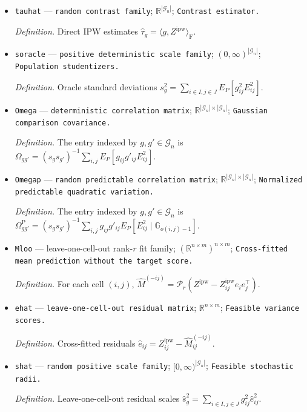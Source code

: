 \documentclass{article}
\begin{document}
\begin{itemize}
  \item \texttt{tauhat} --- \texttt{random contrast family}; \(\mathbb R^{|\mathcal G_n|}\); \texttt{Contrast estimator.}
  \par\smallskip\noindent\emph{Definition.} Direct IPW estimates \(\widehat\tau_g=\langle g,Z^{\mathrm{ipw}}\rangle_{\mathrm F}\).
  \item \texttt{soracle} --- \texttt{positive deterministic scale family}; \((0,\infty)^{|\mathcal G_n|}\); \texttt{Population studentizers.}
  \par\smallskip\noindent\emph{Definition.} Oracle standard deviations \(s_g^2=\sum_{i\in I,j\in J}E_P[g_{ij}^2E_{ij}^2]\).
  \item \texttt{Omega} --- \texttt{deterministic correlation matrix}; \(\mathbb R^{|\mathcal G_n|\times|\mathcal G_n|}\); \texttt{Gaussian comparison covariance.}
  \par\smallskip\noindent\emph{Definition.} The entry indexed by \(g,g'\in\mathcal G_n\) is \(\Omega_{gg'}=(s_gs_{g'})^{-1}\sum_{i,j}E_P[g_{ij}g'_{ij}E_{ij}^2]\).
  \item \texttt{Omegap} --- \texttt{random predictable correlation matrix}; \(\mathbb R^{|\mathcal G_n|\times|\mathcal G_n|}\); \texttt{Normalized predictable quadratic variation.}
  \par\smallskip\noindent\emph{Definition.} The entry indexed by \(g,g'\in\mathcal G_n\) is \(\Omega^{\mathrm P}_{gg'}=(s_gs_{g'})^{-1}\sum_{i,j}g_{ij}g'_{ij}E_P[E_{ij}^2\mid\mathbb G_{o(i,j)-1}]\).
  \item \texttt{Mloo} --- leave-one-cell-out rank-\(r\) fit family; \((\mathbb R^{n\times m})^{n\times m}\); \texttt{Cross-\allowbreak{}fitted mean prediction without the target score.}
  \par\smallskip\noindent\emph{Definition.} For each cell \( (i,j)\), \(\widehat M^{(-ij)}=\mathcal P_r(Z^{\mathrm{ipw}}-Z^{\mathrm{ipw}}_{ij}e_ie_j^\top)\).
  \item \texttt{ehat} --- \texttt{leave-\allowbreak{}one-\allowbreak{}cell-\allowbreak{}out residual matrix}; \(\mathbb R^{n\times m}\); \texttt{Feasible variance scores.}
  \par\smallskip\noindent\emph{Definition.} Cross-fitted residuals \(\widehat e_{ij}=Z^{\mathrm{ipw}}_{ij}-\widehat M^{(-ij)}_{ij}\).
  \item \texttt{shat} --- \texttt{random positive scale family}; \([0,\infty)^{|\mathcal G_n|}\); \texttt{Feasible stochastic radii.}
  \par\smallskip\noindent\emph{Definition.} Leave-one-cell-out residual scales \(\widehat s_g^2=\sum_{i\in I,j\in J}g_{ij}^2\widehat e_{ij}^2\).

\end{itemize}
\end{document}
